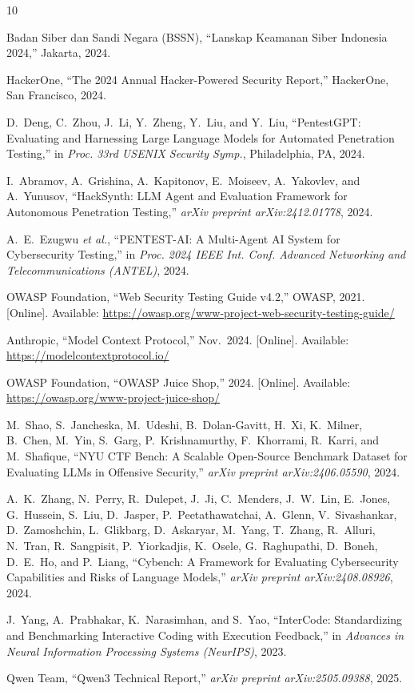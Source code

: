 \documentclass[conference]{IEEEtran}
\begin{document}
\begin{thebibliography}{10}

Badan Siber dan Sandi Negara (BSSN),
``Lanskap Keamanan Siber Indonesia 2024,''
Jakarta, 2024.

HackerOne,
``The 2024 Annual Hacker-Powered Security Report,''
HackerOne, San Francisco, 2024.

D.~Deng, C.~Zhou, J.~Li, Y.~Zheng, Y.~Liu, and Y.~Liu,
``PentestGPT: Evaluating and Harnessing Large Language Models
for Automated Penetration Testing,''
in \textit{Proc. 33rd USENIX Security Symp.},
Philadelphia, PA, 2024.

I.~Abramov, A.~Grishina, A.~Kapitonov, E.~Moiseev,
A.~Yakovlev, and A.~Yunusov,
``HackSynth: LLM Agent and Evaluation Framework for Autonomous
Penetration Testing,''
\textit{arXiv preprint arXiv:2412.01778}, 2024.

A.~E.~Ezugwu \textit{et al.},
``PENTEST-AI: A Multi-Agent AI System for Cybersecurity
Testing,''
in \textit{Proc. 2024 IEEE Int. Conf. Advanced Networking and
Telecommunications (ANTEL)}, 2024.

OWASP Foundation,
``Web Security Testing Guide v4.2,''
OWASP, 2021.
[Online]. Available: \url{https://owasp.org/www-project-web-security-testing-guide/}

Anthropic,
``Model Context Protocol,''
Nov.\ 2024.
[Online]. Available: \url{https://modelcontextprotocol.io/}

OWASP Foundation,
``OWASP Juice Shop,''
2024.
[Online]. Available: \url{https://owasp.org/www-project-juice-shop/}

M.~Shao, S.~Jancheska, M.~Udeshi, B.~Dolan-Gavitt, H.~Xi, K.~Milner, B.~Chen, M.~Yin, S.~Garg, P.~Krishnamurthy, F.~Khorrami, R.~Karri, and M.~Shafique,
``NYU CTF Bench: A Scalable Open-Source Benchmark Dataset for Evaluating LLMs in Offensive Security,''
\emph{arXiv preprint arXiv:2406.05590}, 2024.

A.~K.~Zhang, N.~Perry, R.~Dulepet, J.~Ji, C.~Menders, J.~W.~Lin, E.~Jones, G.~Hussein, S.~Liu, D.~Jasper, P.~Peetathawatchai, A.~Glenn, V.~Sivashankar, D.~Zamoshchin, L.~Glikbarg, D.~Askaryar, M.~Yang, T.~Zhang, R.~Alluri, N.~Tran, R.~Sangpisit, P.~Yiorkadjis, K.~Osele, G.~Raghupathi, D.~Boneh, D.~E.~Ho, and P.~Liang,
``Cybench: A Framework for Evaluating Cybersecurity Capabilities and Risks of Language Models,''
\emph{arXiv preprint arXiv:2408.08926}, 2024.

J.~Yang, A.~Prabhakar, K.~Narasimhan, and S.~Yao,
``InterCode: Standardizing and Benchmarking Interactive Coding with Execution Feedback,''
in \emph{Advances in Neural Information Processing Systems (NeurIPS)}, 2023.

Qwen Team,
``Qwen3 Technical Report,''
\emph{arXiv preprint arXiv:2505.09388}, 2025.

\end{thebibliography}
\end{document}
